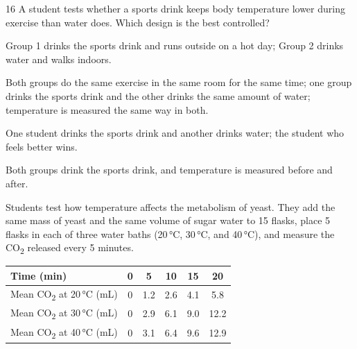 \documentclass[11pt,letterpaper]{article}
\begin{document}
\begin{mcq}{16}
A student tests whether a sports drink keeps body temperature lower during exercise than water does. Which design is the best controlled?
\begin{choices}
  \item Group 1 drinks the sports drink and runs outside on a hot day; Group 2 drinks water and walks indoors.
  \item Both groups do the same exercise in the same room for the same time; one group drinks the sports drink and the other drinks the same amount of water; temperature is measured the same way in both.
  \item One student drinks the sports drink and another drinks water; the student who feels better wins.
  \item Both groups drink the sports drink, and temperature is measured before and after.
\end{choices}
\end{mcq}

\clearpage



Students test how temperature affects the metabolism of yeast. They add the same mass of yeast and the same volume of sugar water to 15 flasks, place 5 flasks in each of three water baths (20\,°C, 30\,°C, and 40\,°C), and measure the CO\textsubscript{2} released every 5 minutes.

\begin{center}
\begin{tabular}{@{}lccccc@{}}
\toprule
Time (min) & 0 & 5 & 10 & 15 & 20 \\
\midrule
Mean CO\textsubscript{2} at 20\,°C (mL) & 0 & 1.2 & 2.6 & 4.1 & 5.8 \\
Mean CO\textsubscript{2} at 30\,°C (mL) & 0 & 2.9 & 6.1 & 9.0 & 12.2 \\
Mean CO\textsubscript{2} at 40\,°C (mL) & 0 & 3.1 & 6.4 & 9.6 & 12.9 \\
\bottomrule
\end{tabular}
\end{center}

\end{document}
